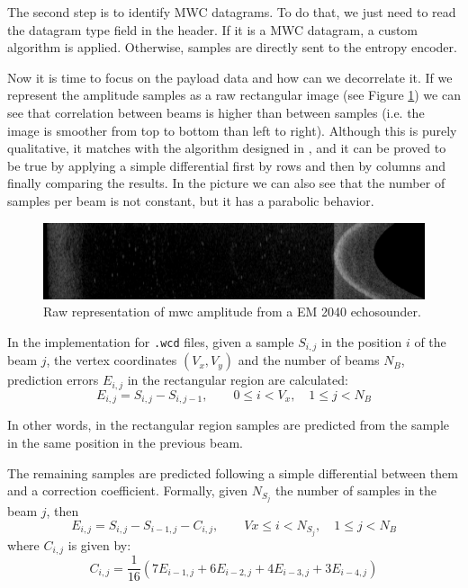 The second step is to identify MWC datagrams. To do that, we just need to read the datagram type field in the header. If it is a MWC datagram, a custom algorithm is applied. Otherwise, samples are directly sent to the entropy encoder.

Now it is time to focus on the payload data and how can we decorrelate it. If we represent the amplitude samples as a raw rectangular image (see Figure \ref{fig:wc_amplitude}) we can see that correlation between beams is higher than between samples (i.e. the image is smoother from top to bottom than left to right). Although this is purely qualitative, it matches with the algorithm designed in \parencite{Portell2019}, and it can be proved to be true by applying a simple differential first by rows and then by columns and finally comparing the results. In the picture we can also see that the number of samples per beam is not constant, but it has a parabolic behavior.
\begin{figure}[h!]
	\begin{center}
		\includegraphics[scale=0.334]{images/water_column_amp.png}
	\end{center}
	\caption{Raw representation of \acrshort{mwc} amplitude from a EM 2040 echosounder.}
	\label{fig:wc_amplitude}
\end{figure}

In the implementation for \texttt{.wcd} files, given a sample $S_{i,j}$ in the position $i$ of the beam $j$, the vertex coordinates $(V_x, V_y)$ and the number of beams $N_B$, prediction errors $E_{i,j}$ in the rectangular region are calculated:
\begin{equation}
E_{i,j} = S_{i,j} - S_{i,j-1}, \qquad 0 \leq i < V_x, \quad 1 \leq j < N_B
\end{equation}

In other words, in the rectangular region samples are predicted from the sample in the same position in the previous beam.

The remaining samples are predicted following a simple differential between them and a correction coefficient. Formally, given $N_{S_j}$ the number of samples in the beam $j$, then
\begin{equation}
E_{i,j} = S_{i,j} - S_{i-1,j} - C_{i,j}, \qquad Vx \leq i < N_{S_j}, \quad 1 \leq j < N_B
\end{equation}
where $C_{i,j}$ is given by:
\begin{equation}
C_{i,j} = \frac{1}{16}(7E_{i-1,j} + 6E_{i-2,j} + 4E_{i-3,j} + 3E_{i-4,j})
\end{equation}


